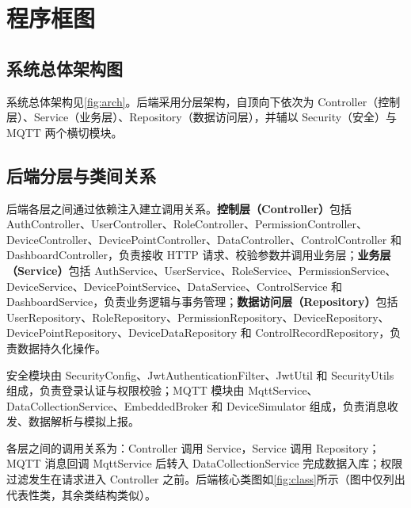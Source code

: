 \documentclass[12pt,hyperref,a4paper,UTF8]{ctexart}
\begin{document}
\section{程序框图}

\subsection{系统总体架构图}

系统总体架构见\autoref{fig:arch}。后端采用分层架构，自顶向下依次为 Controller（控制层）、Service（业务层）、Repository（数据访问层），并辅以 Security（安全）与 MQTT 两个横切模块。

\subsection{后端分层与类间关系}

\begingroup
\small
后端各层之间通过依赖注入建立调用关系。\textbf{控制层（Controller）}包括 AuthController、UserController、RoleController、PermissionController、DeviceController、DevicePointController、DataController、ControlController 和 DashboardController，负责接收 HTTP 请求、校验参数并调用业务层；\textbf{业务层（Service）}包括 AuthService、UserService、RoleService、PermissionService、DeviceService、DevicePointService、DataService、ControlService 和 DashboardService，负责业务逻辑与事务管理；\textbf{数据访问层（Repository）}包括 UserRepository、RoleRepository、PermissionRepository、DeviceRepository、DevicePointRepository、DeviceDataRepository 和 ControlRecordRepository，负责数据持久化操作。

安全模块由 SecurityConfig、JwtAuthenticationFilter、JwtUtil 和 SecurityUtils 组成，负责登录认证与权限校验；MQTT 模块由 MqttService、DataCollectionService、EmbeddedBroker 和 DeviceSimulator 组成，负责消息收发、数据解析与模拟上报。

各层之间的调用关系为：Controller 调用 Service，Service 调用 Repository；MQTT 消息回调 MqttService 后转入 DataCollectionService 完成数据入库；权限过滤发生在请求进入 Controller 之前。后端核心类图如\autoref{fig:class}所示（图中仅列出代表性类，其余类结构类似）。
\endgroup
\end{document}
